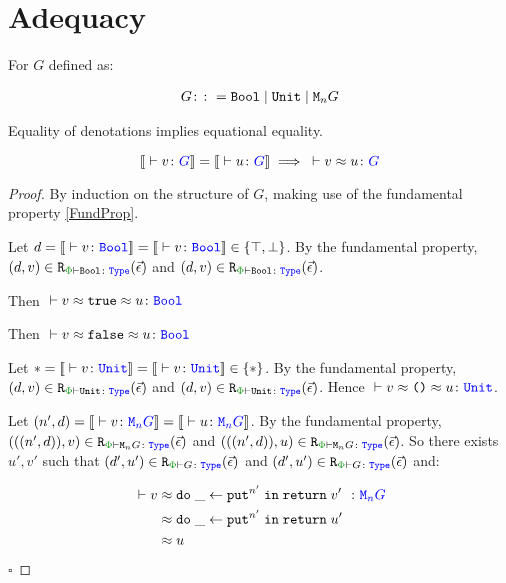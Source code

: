 \documentclass{Report}
\begin{document}
\section{Adequacy}
\begin{theorem}[Adequacy]
For $G$ defined as:

\begin{align*}
    G\colon\colon= \texttt{Bool} \mid \texttt{Unit} \mid \texttt{M}_{n}{G}
\end{align*}

Equality of denotations implies equational equality.

\begin{equation}
    \deno{\ztyperelation{v}{G}} = \deno{\ztyperelation{u}{G}} \implies \zberelation{v}{u}{G}
\end{equation}

\end{theorem}

\begin{proof}
    By induction on the structure of $G$, making use of the fundamental property \ref{FundProp}.

    Let $d=\deno{\ztyperelation{v}{\B}}=\deno{\ztyperelation{v}{\B}}\in \{ \top, \bot\}$. By the fundamental property, $\inLogRelPE{d}{v}{\B}$  and $\inLogRelPE{d}{v}{\B}$.

    Then $\zberelation{v\beequiv\t}{u}{\B}$

    
    Then $\zberelation{v\beequiv\f}{u}{\B}$

    Let $\singleton=\deno{\ztyperelation{v}{\U}}=\deno{\ztyperelation{v}{\U}}\in \{\singleton\}$. By the fundamental property, $\inLogRelPE{d}{v}{\U}$  and $\inLogRelPE{d}{v}{\U}$. Hence $\zberelation{v\beequiv\u}{u}{\U}$.

    \case{\teffect}

    Let $( n',  d) = \deno{\ztyperelation{v}{\M{n}{G}}} = \deno{\ztyperelation{u}{\M{n}{G}}}$. By the fundamental property, $\inLogRelPE{((n', d))}{v}{\M{n}{G}}$ and $\inLogRelPE{((n', d))}{u}{\M{n}{G}}$. So there exists $u', v'$ such that $\inLogRelPE{d'}{u'}{G}$ and $\inLogRelPE{d'}{u'}{G}$ and:

    \begin{align*}
        \zberelation{v&}{\doin{\_}{\put^{n'}}{\return{v'}}}{\M{n}{G}}\\
        &\beequiv \doin{\_}{\put^{n'}}{\return{u'}}\\
        & \beequiv u
    \end{align*}
$\square$
\end{proof}
\end{document}
